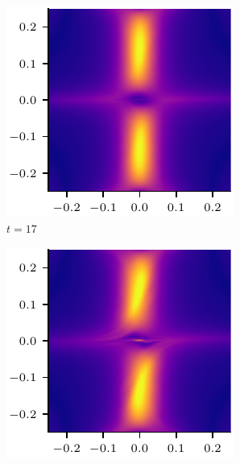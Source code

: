 \begin{figure}[t]
  \centering
    \begin{subfigure}{0.32\textwidth}
      \includegraphics[width=\linewidth]{v-4r-4-spine-fan-reconn-34.pdf}
      \caption{$t=17$}
      \label{fig:v-4r-4-spine-fan-reconn-34}
    \end{subfigure}
    \hfill
    \begin{subfigure}{0.32\textwidth}
      \includegraphics[width=\linewidth]{v-4r-4-spine-fan-reconn-35.pdf}

\end{subfigure}
\end{figure}
